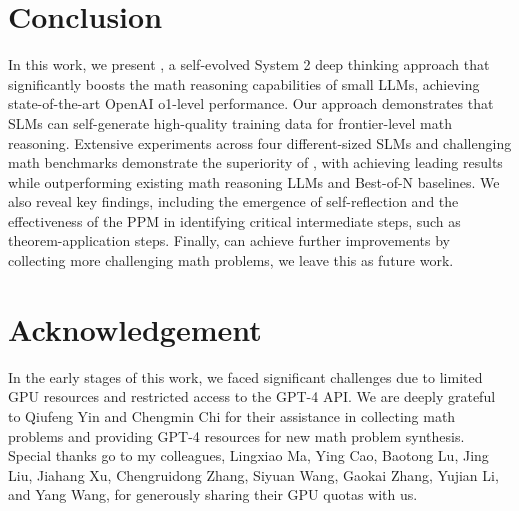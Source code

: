 \section{Conclusion}
In this work, we present {\sysname}, a self-evolved System 2 deep thinking approach that significantly boosts the math reasoning capabilities of small LLMs, achieving state-of-the-art OpenAI o1-level performance. Our approach  demonstrates that SLMs can self-generate high-quality training data for frontier-level math reasoning. Extensive experiments across four different-sized SLMs and challenging math benchmarks demonstrate the superiority of {\sysname}, with achieving leading results while outperforming existing math reasoning LLMs and Best-of-N baselines. We also reveal key findings, including the emergence of self-reflection and the effectiveness of the PPM in identifying critical intermediate steps, such as theorem-application steps. Finally, {\sysname} can achieve further improvements by collecting more challenging math problems, we leave this as future work.

\section*{Acknowledgement}	
In the early stages of this work, we faced significant challenges due to limited GPU resources and restricted access to the GPT-4 API. We are deeply grateful to Qiufeng Yin and Chengmin Chi for their assistance in collecting math problems and providing GPT-4 resources for new math problem synthesis. Special thanks go to my colleagues, Lingxiao Ma, Ying Cao, Baotong Lu, Jing Liu, Jiahang Xu, Chengruidong Zhang, Siyuan Wang, Gaokai Zhang, Yujian Li, and Yang Wang, for generously sharing their GPU quotas with us.